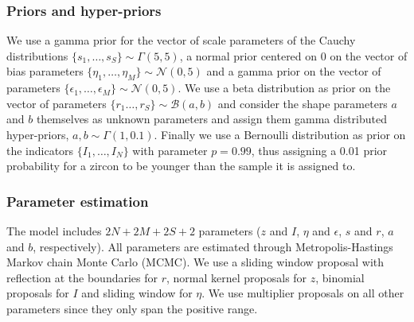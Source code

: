 \documentclass[12pt,letterpaper]{article}
\begin{document}
\subsubsection{Priors and hyper-priors}
We use a gamma prior for the vector of scale parameters of the Cauchy distributions $\{s_1, \dots, s_S \} \sim \Gamma(5, 5)$, a normal prior centered on 0 on the vector of bias parameters $\{\eta_1, \dots, \eta_M \} \sim \mathcal{N}(0, 5)$ and a gamma prior on the vector of parameters $\{\epsilon_1, \dots, \epsilon_M \} \sim \mathcal{N}(0, 5)$.
We use a beta distribution as prior on the vector of parameters $\{r_1 \dots, r_S\} \sim \mathcal{B}(a, b)$ and consider the shape parameters $a$ and $b$ themselves as unknown parameters and assign them gamma distributed hyper-priors, $a, b \sim \Gamma(1, 0.1)$.
Finally we use a Bernoulli distribution as prior on the indicators $\{I_1, \dots, I_N\}$ with parameter $p = 0.99$, thus assigning a 0.01 prior probability for a zircon to be younger than the sample it is assigned to. 

\subsubsection{Parameter estimation}
The model includes $2N + 2M + 2S + 2$ parameters ($z$ and $I$, $\eta$ and $\epsilon$, $s$ and $r$, $a$ and $b$, respectively). 
All parameters are estimated through Metropolis-Hastings Markov chain Monte Carlo (MCMC). We use a sliding window proposal with reflection at the boundaries for $r$, normal kernel proposals for $z$, binomial proposals for $I$ and sliding window for $\eta$. We use multiplier proposals on all other parameters since they only span the positive range. 
\end{document}
